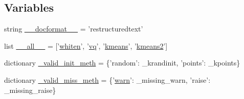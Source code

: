 \subsection*{Variables}
\begin{DoxyCompactItemize}
\item 
string \hyperlink{namespacescipy_1_1cluster_1_1vq_a269068c9eec58420eecf07db13f0e5d5}{\+\_\+\+\_\+docformat\+\_\+\+\_\+} = 'restructuredtext'
\item 
list \hyperlink{namespacescipy_1_1cluster_1_1vq_aa44e5d52c843bc7d5966796bf5abb506}{\+\_\+\+\_\+all\+\_\+\+\_\+} = \mbox{[}'\hyperlink{namespacescipy_1_1cluster_1_1vq_ae5054f4f6a85a7626ef46afd302cf8d0}{whiten}', '\hyperlink{namespacescipy_1_1cluster_1_1vq_a617d8953ae056de229338f05e8c0c9ef}{vq}', '\hyperlink{namespacescipy_1_1cluster_1_1vq_af4bfedf7fde3d48032d839db0477faa1}{kmeans}', '\hyperlink{namespacescipy_1_1cluster_1_1vq_a714311c102593f06182b0fa9f187b20f}{kmeans2}'\mbox{]}
\item 
dictionary \hyperlink{namespacescipy_1_1cluster_1_1vq_a16f327fb1e0d050f586f210c9e285727}{\+\_\+valid\+\_\+init\+\_\+meth} = \{'random'\+: \+\_\+krandinit, 'points'\+: \+\_\+kpoints\}
\item 
dictionary \hyperlink{namespacescipy_1_1cluster_1_1vq_abbc099b68b254c57a0c261d94f38b432}{\+\_\+valid\+\_\+miss\+\_\+meth} = \{'\hyperlink{eepromer_8c_acc421dc81e5dbb4c9cc2f0709f71b861}{warn}'\+: \+\_\+missing\+\_\+warn, 'raise'\+: \+\_\+missing\+\_\+raise\}
\end{DoxyCompactItemize}


